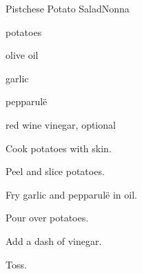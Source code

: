 \begin{recipe}{Pistchese Potato Salad}{Nonna}{}

\begin{ingredients}
\item potatoes
\item olive oil
\item garlic
\item pepparul\"e
\item red wine vinegar, optional
\end{ingredients}

\begin{directions}
\item Cook potatoes with skin.
\item Peel and slice potatoes.
\item Fry garlic and pepparul\"e in oil.
\item Pour over potatoes.
\item Add a dash of vinegar.
\item Toss.
\end{directions}

\end{recipe}
